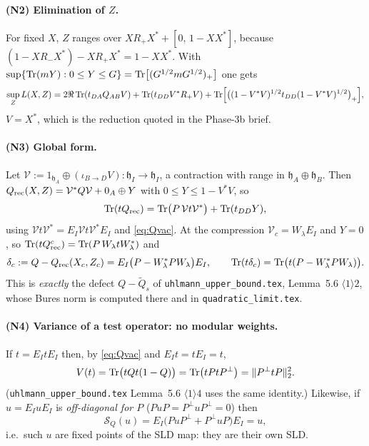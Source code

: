 \documentclass[11pt]{article}
\begin{document}
\paragraph{(N2) Elimination of $Z$.}
For fixed $X$, $Z$ ranges over $XR_+X^*+[0,\,1-XX^*]$, because
$(1-XR_-X^*)-XR_+X^*=1-XX^*$.  With
$\sup\{\operatorname{Tr}(mY):0\le Y\le G\}=\operatorname{Tr}\bigl[(G^{1/2}mG^{1/2})_+\bigr]$ one gets
\begin{equation}\label{eq:Zelim}
 \sup_{Z}L(X,Z)=2\Re\operatorname{Tr}(t_{DA}Q_{AB}V)+\operatorname{Tr}(t_{DD}V^*R_+V)
  +\operatorname{Tr}\Bigl[\bigl((1-V^*V)^{1/2}t_{DD}(1-V^*V)^{1/2}\bigr)_+\Bigr],
\end{equation}
$V=X^*$, which is the reduction quoted in the Phase-3b brief.

\paragraph{(N3) Global form.}
Let $\mathcal V:=1_{\mathfrak h_A}\oplus(\iota_{B\to D}V):\mathfrak h_I\to\mathfrak h_I$, a
contraction with range in $\mathfrak h_A\oplus\mathfrak h_B$.  Then
$Q_{\rm rec}(X,Z)=\mathcal V^*Q\mathcal V+0_A\oplus Y$ with $0\le Y\le 1-V^*V$, so
\begin{equation}\label{eq:global}
 \operatorname{Tr}(tQ_{\rm rec})=\operatorname{Tr}\bigl(P\,\mathcal Vt\mathcal V^*\bigr)+\operatorname{Tr}(t_{DD}Y),
\end{equation}
using $\mathcal Vt\mathcal V^*=E_I\mathcal Vt\mathcal V^*E_I$ and \eqref{eq:Qvac}.  At the
compression $\mathcal V_c=W_\lambda E_I$ and $Y=0$, so
$\operatorname{Tr}(tQ_{\rm rec}^c)=\operatorname{Tr}(P\,W_\lambda tW_\lambda^*)$ and
\begin{equation}\label{eq:deltac}
 \delta_c:=Q-Q_{\rm rec}(X_c,Z_c)=E_I\bigl(P-W_\lambda^*PW_\lambda\bigr)E_I,\qquad
 \operatorname{Tr}(t\delta_c)=\operatorname{Tr}\bigl(t(P-W_\lambda^*PW_\lambda)\bigr).
\end{equation}
This is \emph{exactly} the defect $Q-\widetilde Q_s$ of
\texttt{uhlmann\_upper\_bound.tex}, Lemma~5.6 $\langle1\rangle2$, whose Bures norm is
computed there and in \texttt{quadratic\_limit.tex}.

\paragraph{(N4) Variance of a test operator: no modular weights.}
If $t=E_ItE_I$ then, by \eqref{eq:Qvac} and $E_It=tE_I=t$,
\begin{equation}\label{eq:Vt}
 V(t)=\operatorname{Tr}\bigl(tQt(1-Q)\bigr)=\operatorname{Tr}\bigl(tPtP^\perp\bigr)=\|P^\perp tP\|_2^2 .
\end{equation}
(\texttt{uhlmann\_upper\_bound.tex} Lemma~5.6 $\langle1\rangle4$ uses the same identity.)
Likewise, if $u=E_IuE_I$ is \emph{off-diagonal for $P$} ($PuP=P^\perp uP^\perp=0$) then
\begin{equation}\label{eq:fixed}
 \mathcal S_Q(u)=E_I\bigl(PuP^\perp+P^\perp uP\bigr)E_I=u ,
\end{equation}
i.e.\ such $u$ are fixed points of the SLD map: they are their own SLD.
\end{document}
